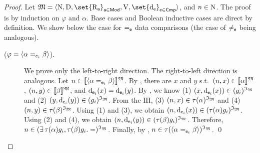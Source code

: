 \begin{proof}
    Let $\model = \tup{ \N, \D, \set{\R_{\apath}}_{\apath \in \mods}, \valuation,\set{\data_\cmp}_{\cmp \in \cmps} }$, and $n \in \mathrm{N}$.
    The proof is by induction on $\varphi$ and $\alpha$. Base cases and Boolean inductive cases are direct by definition. We show below the case for $=_{\mathsf{e}}$ data comparisons (the case of $\neq_{\mathsf{e}}$ being analogous).
    \begin{description}
        \item[($\varphi = \langle{\alpha =_{\mathsf{e}_i} \beta}\rangle$).] 
                
        We prove only the left-to-right direction. The right-to-left direction is analogous.
        Let ${n \in \llbracket{  \langle{\alpha =_{\mathsf{e}_i} \beta}\rangle}\rrbracket^{\mathfrak{M}}}$. 
        By , there are $x$ and $y$ s.t.\
            $(n,x) \in \llbracket{ \alpha}\rrbracket^{\mathfrak{M}}$,
            $(n,y) \in  \llbracket{ \beta}\rrbracket^{\mathfrak{M}}$, and
            $\operatorname{d}_{\mathsf{e}_i}(x) = \operatorname{d}_{\mathsf{e}_i}(y)$. 
        By , we know
            (1) $(x,\operatorname{d}_{\mathsf{e}_i}(x)) \in (g_i)^{\mathfrak{I}_{\mathfrak{M}}}$ and
            (2) ${(y,\operatorname{d}_{\mathsf{e}_i}(y)) \in (g_i)^{\mathfrak{I}_{\mathfrak{M}}}}$.
        From the IH,
            (3) ${(n,x) \in \operatorname{\tau}(\alpha)^{\mathfrak{I}_{\mathfrak{M}}}}$ and
            (4) $(n,y) \in \operatorname{\tau}(\beta)^{\mathfrak{I}_{\mathfrak{M}}}$. 
        Using (1) and (3),
            we obtain $(n,\operatorname{d}_{\mathsf{e}_i}(x)) \in (\operatorname{\tau}(\alpha) g_i)^{\mathfrak{I}_{\mathfrak{M}}}$. 
        Using (2) and (4),
            we obtain  $(n,\operatorname{d}_{\mathsf{e}_i}(y)) \in (\operatorname{\tau}(\beta) g_i)^{\mathfrak{I}_{\mathfrak{M}}}$.
        Therefore, $n \in (\exists \operatorname{\tau}(\alpha)g_i, \operatorname{\tau}(\beta)g_i. =)^{\mathfrak{I}_{\mathfrak{M}}}$.
        Finally, by \Cref{def:translation}, $n \in \operatorname{\tau}(\langle{\alpha =_{\mathsf{e}_i} \beta}\rangle)^{\mathfrak{I}_{\mathfrak{M}}}$. \qed 
    \end{description}


\end{proof}
